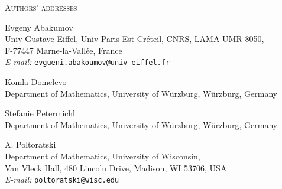\documentclass{article}
\begin{document}
	\bigskip
	\footnotesize
	\noindent\textsc{Authors' addresses}

	\medskip
	\noindent Evgeny Abakumov\\
	Univ Gustave Eiffel, Univ Paris Est Cr\'eteil, CNRS, LAMA UMR 8050,\\
	F-77447 Marne-la-Vall\'ee, France\\
	\textit{E-mail:} \texttt{evgueni.abakoumov@univ-eiffel.fr}

	\medskip
	\noindent Komla Domelevo\\
	Department of Mathematics, University of W\"urzburg, W\"urzburg, Germany

	\medskip
	\noindent Stefanie Petermichl\\
	Department of Mathematics, University of W\"urzburg, W\"urzburg, Germany

	\medskip
	\noindent A. Poltoratski\\
	Department of Mathematics, University of Wisconsin,\\
	Van Vleck Hall, 480 Lincoln Drive, Madison, WI 53706, USA\\
	\textit{E-mail:} \texttt{poltoratski@wisc.edu}
\end{document}
